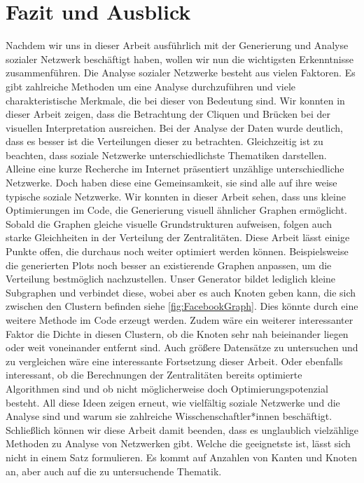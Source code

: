 \chapter{Fazit und Ausblick}\label{ch:fazit}

Nachdem wir uns in dieser Arbeit ausführlich mit der Generierung und Analyse sozialer Netzwerk beschäftigt haben, wollen wir nun die wichtigsten Erkenntnisse zusammenführen. Die Analyse sozialer Netzwerke besteht aus vielen Faktoren. Es gibt zahlreiche Methoden um eine Analyse durchzuführen und viele charakteristische Merkmale, die bei dieser von Bedeutung sind. Wir konnten in dieser Arbeit zeigen, dass die Betrachtung der Cliquen und Brücken bei der visuellen Interpretation ausreichen. Bei der Analyse der Daten wurde deutlich, dass es besser ist die Verteilungen dieser zu betrachten. Gleichzeitig ist zu beachten, dass soziale Netzwerke unterschiedlichste Thematiken darstellen. Alleine eine kurze Recherche im Internet präsentiert unzählige unterschiedliche Netzwerke. Doch haben diese eine Gemeinsamkeit, sie sind alle auf ihre weise typische soziale Netzwerke. Wir konnten in dieser Arbeit sehen, dass uns kleine Optimierungen im Code, die Generierung visuell ähnlicher Graphen ermöglicht. Sobald die Graphen gleiche visuelle Grundstrukturen aufweisen, folgen auch starke Gleichheiten in der Verteilung der Zentralitäten. Diese Arbeit lässt einige Punkte offen, die durchaus noch weiter optimiert werden können. Beispielsweise die generierten Plots noch besser an existierende Graphen anpassen, um die Verteilung bestmöglich nachzustellen. 
Unser Generator bildet lediglich kleine Subgraphen und verbindet diese, wobei aber es auch Knoten geben kann, die sich zwischen den Clustern befinden siehe \ref{fig:FacebookGraph}. Dies könnte durch eine weitere Methode im Code erzeugt werden. Zudem wäre ein weiterer interessanter Faktor die Dichte in diesen Clustern, ob die Knoten sehr nah beieinander liegen oder weit voneinander entfernt sind.
Auch größere Datensätze zu untersuchen und zu vergleichen wäre eine interessante Fortsetzung dieser Arbeit. Oder ebenfalls interessant, ob die Berechnungen der Zentralitäten bereits optimierte Algorithmen sind und ob nicht möglicherweise doch Optimierungspotenzial besteht.  
All diese Ideen zeigen erneut, wie vielfältig soziale Netzwerke und die Analyse sind und warum sie zahlreiche Wisschenschaftler*innen beschäftigt. Schließlich können wir diese Arbeit damit beenden, dass es unglaublich vielzählige Methoden zu Analyse von Netzwerken gibt. Welche die geeignetste ist, lässt sich nicht in einem Satz formulieren. Es kommt auf Anzahlen von Kanten und Knoten an, aber auch auf die zu untersuchende Thematik.